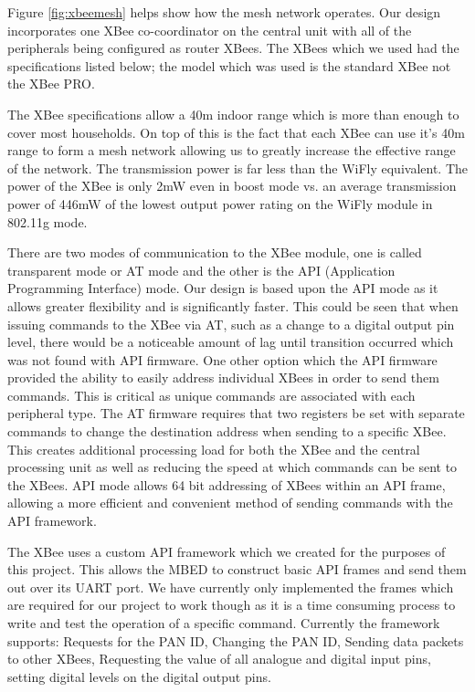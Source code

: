 \documentclass[10.5pt,a4paper,twoside]{report}   %
\begin{document}
Figure \ref{fig:xbeemesh} helps show how the mesh network operates. Our design incorporates one XBee co-coordinator on the central unit with all of the peripherals being configured as router XBees. The XBees which we used had the specifications listed below; the model which was used is the standard XBee not the XBee PRO.

The XBee specifications allow a 40m indoor range which is more than enough to cover most households. On top of this is the fact that each XBee can use it's 40m range to form a mesh network allowing us to greatly increase the effective range of the network. The transmission power is far less than the WiFly equivalent. The power of the XBee is only 2mW even in boost mode vs. an average transmission power of 446mW of the lowest output power rating on the WiFly module in 802.11g mode.

There are two modes of communication to the XBee module, one is called transparent mode or AT mode and the other is the API (Application Programming Interface) mode. Our design is based upon the API mode as it allows greater flexibility and is significantly faster. This could be seen that when issuing commands to the XBee via AT, such as a change to a digital output pin level, there would be a noticeable amount of lag until transition occurred which was not found with API firmware. One other option which the API firmware provided the ability to easily address individual XBees in order to send them commands. This is critical as unique commands are associated with each peripheral type. The AT firmware requires that two registers be set with separate commands to change the destination address when sending to a specific XBee. This creates additional processing load for both the XBee and the central processing unit as well as reducing the speed at which commands can be sent to the XBees. API mode allows 64 bit addressing of XBees within an API frame, allowing a more efficient and convenient method of sending commands with the API framework.

The XBee uses a custom API framework which we created for the purposes of this project. This allows the MBED to construct basic API frames and send them out over its UART port. We have currently only implemented the frames which are required for our project to work though as it is a time consuming process to write and test the operation of a specific command. Currently the framework supports: Requests for the PAN ID, Changing the PAN ID, Sending data packets to other XBees, Requesting the value of all analogue and digital input pins, setting digital levels on the digital output pins.
\end{document}

